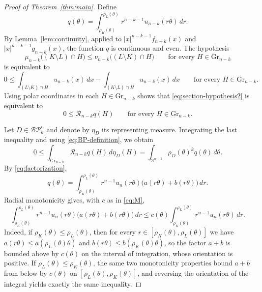 \documentclass{amsart}
\theoremstyle{remark}
\newcommand{\Sph}{\mathbb{S}}
\newcommand{\BP}{\mathcal{BP}}
\newcommand{\Gr}{\mathrm{Gr}}
\newcommand{\dd}{\,d}
\begin{document}
\begin{proof}[Proof of Theorem~\ref{thm:main}]
Define
\begin{equation}\label{eq:qtheta}
 q(\theta)=
 \int_{\rho_K(\theta)}^{\rho_L(\theta)}
 r^{n-k-1}u_{n-k}(r\theta)\dd r.
\end{equation}
By Lemma~\ref{lem:continuity}, applied to
$|x|^{n-k-1}f_{n-k}(x)$ and
$|x|^{n-k-1}g_{n-k}(x)$, the function $q$ is continuous and even. The
hypothesis
\[
 \mu_{n-k}\bigl((K\setminus L)\cap H\bigr)
 \leq
 \nu_{n-k}\bigl((L\setminus K)\cap H\bigr)
 \qquad\text{for every }H\in\Gr_{n-k}
\]
is equivalent to
\begin{equation}\label{eq:section-hypothesis2}
 0\leq
 \int_{(L\setminus K)\cap H}u_{n-k}(x)\dd x
 -\int_{(K\setminus L)\cap H}u_{n-k}(x)\dd x
 \qquad\text{for every }H\in\Gr_{n-k}.
\end{equation}
Using polar coordinates in each $H\in\Gr_{n-k}$ shows that
\eqref{eq:section-hypothesis2} is equivalent to
\[
 0\leq\mathcal R_{n-k}q(H)
 \qquad\text{for every }H\in\Gr_{n-k}.
\]

Let $D\in\BP_k^n$ and denote by $\eta_D$ its representing
measure. Integrating the last inequality and using \eqref{eq:BP-definition},
we obtain
\begin{equation}\label{eq:positive-D}
 0\leq\int_{\Gr_{n-k}}\mathcal R_{n-k}q(H)\dd\eta_D(H)
 =\int_{\Sph^{n-1}}\rho_D(\theta)^k q(\theta)\dd\theta.
\end{equation}
By \eqref{eq:factorization},
\[
 q(\theta)
 =\int_{\rho_K(\theta)}^{\rho_L(\theta)}
 r^{n-1}u_n(r\theta)\bigl(a(r\theta)+b(r\theta)\bigr)\dd r.
\]
Radial monotonicity gives, with $c$ as in \eqref{eq:M},
\begin{equation}\label{eq:pointwise-bound}
 \int_{\rho_K(\theta)}^{\rho_L(\theta)}
 r^{n-1}u_n(r\theta)\bigl(a(r\theta)+b(r\theta)\bigr)\dd r
 \leq c(\theta)
 \int_{\rho_K(\theta)}^{\rho_L(\theta)}
 r^{n-1}u_n(r\theta)\dd r.
\end{equation}
Indeed, if $\rho_K(\theta)\leq\rho_L(\theta)$, then for every
$r\in[\rho_K(\theta),\rho_L(\theta)]$ we have
$a(r\theta)\leq a(\rho_L(\theta)\theta)$ and
$b(r\theta)\leq b(\rho_K(\theta)\theta)$, so the factor $a+b$ is bounded above
by $c(\theta)$ on the interval of integration, whose orientation is positive.
If $\rho_L(\theta)\leq\rho_K(\theta)$, the same two monotonicity properties
bound $a+b$ from below by $c(\theta)$ on $[\rho_L(\theta),\rho_K(\theta)]$,
and reversing the orientation of the integral yields exactly the same
inequality.


\end{proof}
\end{document}
